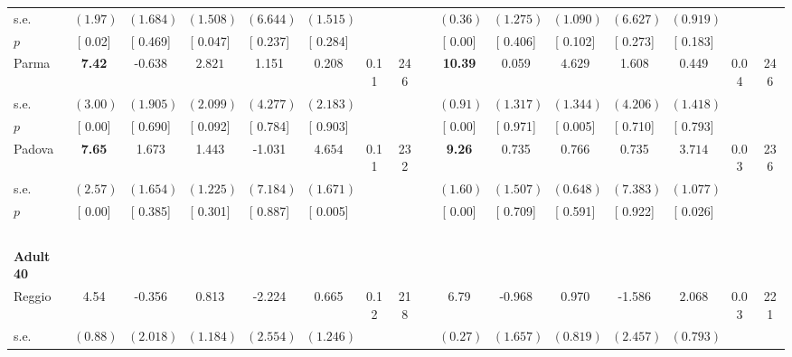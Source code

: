 \begin{longtable}{L{8em} c c c c c c c p{1em} c c c c c c c}
\quad \quad \quad \quad s.e.& $ (     1.97)$ & $ (    1.684)$ & $ (    1.508)$ & $ (    6.644)$ & $ (    1.515)$ & & & & $ (     0.36)$ & $ (    1.275)$ & $ (    1.090)$ & $ (    6.627)$ & $ (    0.919)$ & &  \\*
\quad \quad \quad \quad $ p$ & [     0.02] & [    0.469] & [    0.047] & [    0.237] & [    0.284] & & & & [     0.00] & [    0.406] & [    0.102] & [    0.273] & [    0.183] & &  \\[1em]
\quad \quad \quad Parma& \textbf{     7.42} &    -0.638 & $ \mathbf{    2.821}$ &     1.151 &     0.208 &      0.11 &       246 & & \textbf{    10.39} &     0.059 & $ \mathbf{    4.629}$ &     1.608 &     0.449 &      0.04 &       246  \\*
\quad \quad \quad \quad s.e.& $ (     3.00)$ & $ (    1.905)$ & $ (    2.099)$ & $ (    4.277)$ & $ (    2.183)$ & & & & $ (     0.91)$ & $ (    1.317)$ & $ (    1.344)$ & $ (    4.206)$ & $ (    1.418)$ & &  \\*
\quad \quad \quad \quad $ p$ & [     0.00] & [    0.690] & [    0.092] & [    0.784] & [    0.903] & & & & [     0.00] & [    0.971] & [    0.005] & [    0.710] & [    0.793] & &  \\[1em]
\quad \quad \quad Padova& \textbf{     7.65} &     1.673 &     1.443 &    -1.031 & $ \mathbf{    4.654}$ &      0.11 &       232 & & \textbf{     9.26} &     0.735 &     0.766 &     0.735 & $ \mathbf{    3.714}$ &      0.03 &       236  \\*
\quad \quad \quad \quad s.e.& $ (     2.57)$ & $ (    1.654)$ & $ (    1.225)$ & $ (    7.184)$ & $ (    1.671)$ & & & & $ (     1.60)$ & $ (    1.507)$ & $ (    0.648)$ & $ (    7.383)$ & $ (    1.077)$ & &  \\*
\quad \quad \quad \quad $ p$ & [     0.00] & [    0.385] & [    0.301] & [    0.887] & [    0.005] & & & & [     0.00] & [    0.709] & [    0.591] & [    0.922] & [    0.026] & &  \\[1em]
~\\[1em]
\quad \quad \textbf{Adult 40} & & & & & & & & & & & & & & & \\* 
\quad \quad \quad Reggio& 4.54 &    -0.356 &     0.813 &    -2.224 &     0.665 &      0.12 &       218 & & 6.79 &    -0.968 &     0.970 &    -1.586 & $ \mathbf{    2.068}$ &      0.03 &       221  \\*
\quad \quad \quad \quad s.e.& $ (     0.88)$ & $ (    2.018)$ & $ (    1.184)$ & $ (    2.554)$ & $ (    1.246)$ & & & & $ (     0.27)$ & $ (    1.657)$ & $ (    0.819)$ & $ (    2.457)$ & $ (    0.793)$ & &  \\*

\end{longtable}
